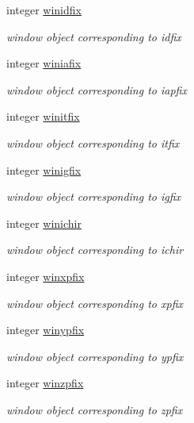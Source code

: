 \begin{DoxyCompactItemize}
integer \hyperlink{classkgeoms_ac1977b191ae255c7987622fcf69f9fde}{winidfix}
\begin{DoxyCompactList}\small\item\em window object corresponding to idfix \end{DoxyCompactList}\item 
integer \hyperlink{classkgeoms_adae1d3f57b925a5b1d9ef29dba13323e}{winiafix}
\begin{DoxyCompactList}\small\item\em window object corresponding to iapfix \end{DoxyCompactList}\item 
integer \hyperlink{classkgeoms_a4ef80408ce8a0e25f47e95bf3fb7ff15}{winitfix}
\begin{DoxyCompactList}\small\item\em window object corresponding to itfix \end{DoxyCompactList}\item 
integer \hyperlink{classkgeoms_a8b3e8e6e93f4f27f90080072acd6f51c}{winigfix}
\begin{DoxyCompactList}\small\item\em window object corresponding to igfix \end{DoxyCompactList}\item 
integer \hyperlink{classkgeoms_a3bc7d77bc12ca32dd5e71a291460e29e}{winichir}
\begin{DoxyCompactList}\small\item\em window object corresponding to ichir \end{DoxyCompactList}\item 
integer \hyperlink{classkgeoms_ab2595aff393c09438e99c50c6b7e4000}{winxpfix}
\begin{DoxyCompactList}\small\item\em window object corresponding to xpfix \end{DoxyCompactList}\item 
integer \hyperlink{classkgeoms_a0a2ff7537ea5a9e2ecf83ede128a2582}{winypfix}
\begin{DoxyCompactList}\small\item\em window object corresponding to ypfix \end{DoxyCompactList}\item 
integer \hyperlink{classkgeoms_ad8e2ec8f4c20787f0d0420c916852997}{winzpfix}
\begin{DoxyCompactList}\small\item\em window object corresponding to zpfix \end{DoxyCompactList}\item 

\end{DoxyCompactItemize}
